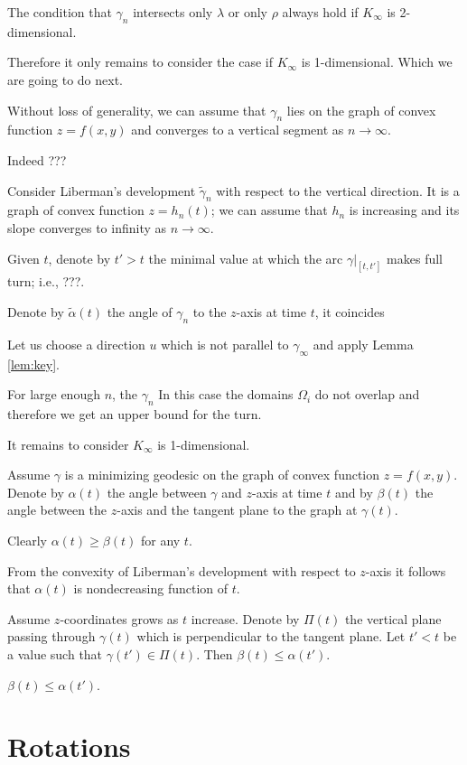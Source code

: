 \documentclass[a4paper,10pt]{amsart}
\begin{document}
The condition that $\gamma_n$ intersects only $\lambda$ or only $\rho$ always hold if $K_\infty$ is 2-dimensional.

Therefore it only remains to consider the case if $K_\infty$ is 1-dimensional.
Which we are going to do next.

Without loss of generality, we can assume that $\gamma_n$ lies on the graph of convex function $z=f(x,y)$ and converges to a vertical segment as $n\to \infty$.

\medskip

Indeed ???

Consider Liberman's development $\tilde\gamma_n$ with respect to the vertical direction.
It is a graph of convex function $z=h_n(t)$;
we can assume that $h_n$ is increasing and its slope converges to infinity as $n\to\infty$.

Given $t$, denote by $t'>t$ the minimal value at which the arc $\gamma|_{[t,t']}$ makes full turn; i.e., ???.

Denote by $\tilde\alpha(t)$ the angle of $\gamma_n$ to the $z$-axis at time $t$,
it coincides 


Let us choose a direction $u$ 
which is not parallel to $\gamma_\infty$ and apply Lemma \ref{lem:key}.

For large enough $n$, 
the $\gamma_n$ 
In this case the domains $\Omega_i$ do not overlap and therefore we get an upper bound for the turn.

It remains to consider  $K_\infty$ is 1-dimensional.

Assume $\gamma$ is a minimizing geodesic on the graph of convex function $z=f(x,y)$.
Denote by $\alpha(t)$ the angle between $\gamma$ and $z$-axis at time $t$
and by $\beta(t)$ the angle between the $z$-axis and the tangent plane to the graph at $\gamma(t)$.

Clearly $\alpha(t)\ge \beta(t)$ for any $t$.

From the convexity of Liberman's development with respect to $z$-axis it follows that $\alpha(t)$ is nondecreasing function of $t$.

Assume $z$-coordinates grows as $t$ increase.
Denote by $\Pi(t)$ the vertical plane passing through $\gamma(t)$ which is perpendicular to the tangent plane.
Let $t'<t$ be a value such that $\gamma(t')\in \Pi(t)$.
Then $\beta(t)\le \alpha(t')$.

$\beta(t)\le \alpha(t')$.

\section{Rotations}
\end{document}
